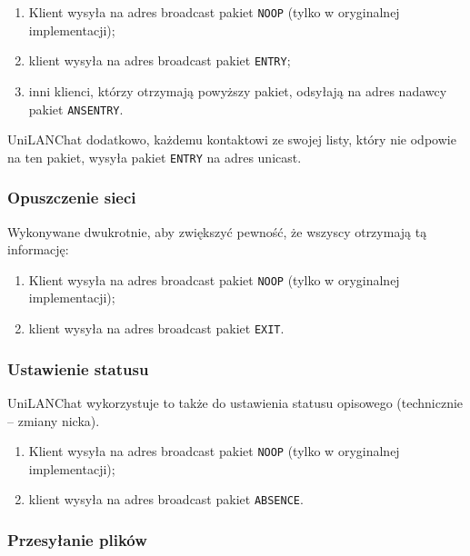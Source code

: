 \documentclass[11pt,leqno]{article}
\begin{document}
\begin{enumerate}
	\item Klient wysyła na adres broadcast pakiet \texttt{NOOP} (tylko w oryginalnej
	implementacji);
	\item klient wysyła na adres broadcast pakiet \texttt{ENTRY};
	\item inni klienci, którzy otrzymają powyższy pakiet, odsyłają na adres nadawcy
	pakiet \texttt{ANSENTRY}.
\end{enumerate}

UniLANChat dodatkowo, każdemu kontaktowi ze swojej listy, który nie odpowie na ten pakiet,
wysyła pakiet \texttt{ENTRY} na adres unicast.

\subsubsection{Opuszczenie sieci}

Wykonywane dwukrotnie, aby zwiększyć pewność, że wszyscy otrzymają tą informację:
\begin{enumerate}
	\item Klient wysyła na adres broadcast pakiet \texttt{NOOP} (tylko w oryginalnej
	implementacji);
	\item klient wysyła na adres broadcast pakiet \texttt{EXIT}.
\end{enumerate}

\subsubsection{Ustawienie statusu}

UniLANChat wykorzystuje to także do ustawienia statusu opisowego (technicznie -- zmiany nicka).
\begin{enumerate}
	\item Klient wysyła na adres broadcast pakiet \texttt{NOOP} (tylko w oryginalnej
	implementacji);
	\item klient wysyła na adres broadcast pakiet \texttt{ABSENCE}.
\end{enumerate}

\subsubsection{Przesyłanie plików}
\end{document}
